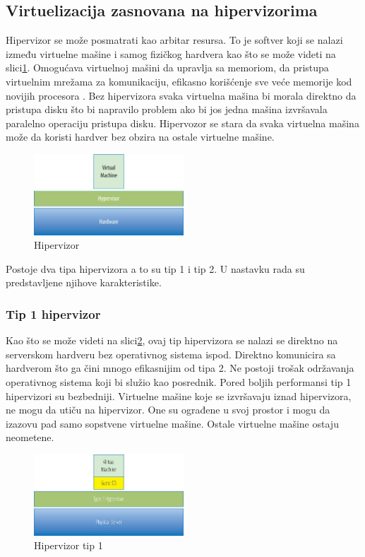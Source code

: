 \documentclass[12pt,oneside]{memoir}
\begin{document}
\subsection{Virtuelizacija zasnovana na hipervizorima}
Hipervizor se može posmatrati kao arbitar resursa. To je softver koji se nalazi između virtuelne mašine i samog fizičkog hardvera kao što se može videti na slici\ref{fig:hipervizor}. Omogućava virtuelnoj mašini da upravlja sa memoriom, da pristupa virtuelnim mrežama za komunikaciju, efikasno korišćenje sve veće memorije kod novijih procesora \cite{ve}. Bez hipervizora svaka virtuelna mašina bi morala direktno da pristupa disku što bi napravilo problem ako bi jos jedna mašina izvršavala paralelno operaciju pristupa disku. Hipervozor se stara da svaka virtuelna mašina može da koristi hardver bez obzira na ostale virtuelne mašine.
\begin{figure}[!ht]
  \centering
  \includegraphics[width=0.5\textwidth]{Slika 1.jpg}
  \caption{Hipervizor}
  \label{fig:hipervizor}
\end{figure}
 
Postoje dva tipa hipervizora a to su tip 1 i tip 2. U nastavku rada su predstavljene njihove karakteristike.
 
\subsubsection{Tip 1 hipervizor}
Kao što se može videti na slici\ref{fig:hipervizorTip1}, ovaj tip hipervizora se nalazi se direktno na serverskom hardveru bez operativnog sistema ispod. Direktno komunicira sa hardverom što ga čini mnogo efikasnijim od tipa 2. Ne postoji trošak održavanja operativnog sistema koji bi služio kao posrednik. Pored boljih performansi tip 1 hipervizori su bezbedniji. Virtuelne mašine koje se izvršavaju iznad hipervizora, ne mogu da utiču na hipervizor. One su ograđene u svoj prostor i mogu da izazovu pad samo sopstvene virtuelne mašine. Ostale virtuelne mašine ostaju neometene.
\begin{figure}[!ht]
  \centering
  \includegraphics[width=0.5\textwidth]{Slika 2.jpg}
  \caption{Hipervizor tip 1}
  \label{fig:hipervizorTip1}
\end{figure}
 
\end{document}

